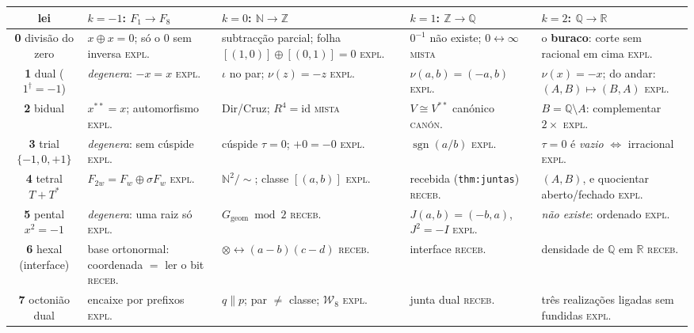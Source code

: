 \documentclass[11pt,a4paper]{article}
\newcommand{\code}[1]{\texttt{\small #1}}
\newcommand{\Word}{\mathcal{W}}
\newcommand{\dg}{^{\dagger}}
\begin{document}
\begin{center}\footnotesize
\begin{tabular}{@{}cp{2.75cm}p{2.75cm}p{2.75cm}p{2.75cm}@{}}
\toprule
lei & $k{=}-1$: $F_1\!\to\!F_8$ & $k{=}0$: $\mathbb{N}\!\to\!\mathbb{Z}$ & $k{=}1$: $\mathbb{Z}\!\to\!\mathbb{Q}$ & $k{=}2$: $\mathbb{Q}\!\to\!\mathbb{R}$ \\
\midrule
\textbf{0} divisão do zero
 & $x\oplus x=0$; só o $0$ sem inversa \hfill\textsc{expl.}
 & subtracção parcial; folha $[(1,0)]\oplus[(0,1)]=0$ \hfill\textsc{expl.}
 & $0^{-1}$ não existe; $0\!\leftrightarrow\!\infty$ \hfill\textsc{mista}
 & o \textbf{buraco}: corte sem racional em cima \hfill\textsc{expl.} \\
\textbf{1} dual ($1\dg=-1$)
 & \emph{degenera}: $-x=x$ \hfill\textsc{expl.}
 & $\iota$ no par; $\nu(z)=-z$ \hfill\textsc{expl.}
 & $\nu(a,b)=(-a,b)$ \hfill\textsc{expl.}
 & $\nu(x)=-x$; do andar: $(A,B)\!\mapsto\!(B,A)$ \hfill\textsc{expl.} \\
\textbf{2} bidual
 & $x^{**}=x$; automorfismo \hfill\textsc{expl.}
 & Dir/Cruz; $R^{4}=\mathrm{id}$ \hfill\textsc{mista}
 & $V\cong V^{**}$ canónico \hfill\textsc{canón.}
 & $B=\mathbb{Q}\setminus A$: complementar $2\times$ \hfill\textsc{expl.} \\
\textbf{3} trial $\{-1,0,+1\}$
 & \emph{degenera}: sem cúspide \hfill\textsc{expl.}
 & cúspide $\tau=0$; $+0=-0$ \hfill\textsc{expl.}
 & $\operatorname{sgn}(a/b)$ \hfill\textsc{expl.}
 & $\tau=0$ é \emph{vazio} $\iff$ irracional \hfill\textsc{expl.} \\
\textbf{4} tetral $T+T^{*}$
 & $F_{2w}=F_w\oplus\sigma F_w$ \hfill\textsc{expl.}
 & $\mathbb{N}^{2}/{\sim}$; classe $[(a,b)]$ \hfill\textsc{expl.}
 & recebida (\code{thm:juntas}) \hfill\textsc{receb.}
 & $(A,B)$, e quocientar aberto/fechado \hfill\textsc{expl.} \\
\textbf{5} pental $x^{2}=-1$
 & \emph{degenera}: uma raiz só \hfill\textsc{expl.}
 & $G_{\mathrm{geom}}\bmod2$ \hfill\textsc{receb.}
 & $J(a,b)=(-b,a)$, $J^{2}=-I$ \hfill\textsc{expl.}
 & \emph{não existe}: ordenado \hfill\textsc{expl.} \\
\textbf{6} hexal (interface)
 & base ortonormal: coordenada $=$ ler o bit \hfill\textsc{receb.}
 & $\otimes\leftrightarrow(a-b)(c-d)$ \hfill\textsc{receb.}
 & interface \hfill\textsc{receb.}
 & densidade de $\mathbb{Q}$ em $\mathbb{R}$ \hfill\textsc{receb.} \\
\textbf{7} octonião dual
 & encaixe por prefixos \hfill\textsc{expl.}
 & $q\parallel p$; par $\neq$ classe; $\Word_8$ \hfill\textsc{expl.}
 & junta dual \hfill\textsc{receb.}
 & três realizações ligadas sem fundidas \hfill\textsc{expl.} \\
\bottomrule
\end{tabular}
\end{center}
\end{document}
